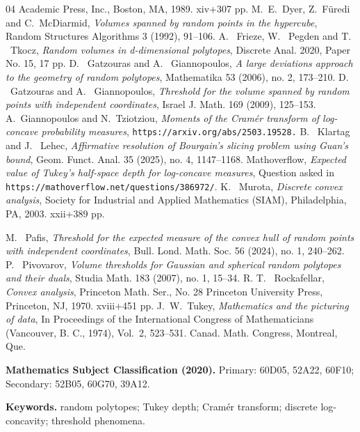 \documentclass[11pt,a4paper]{article} %
\theoremstyle{definition}
\theoremstyle{remark}
\newcommand{\1}{\mathds{1}}
\begin{document}
\begin{thebibliography}{04}
Academic Press, Inc., Boston, MA, 1989. xiv+307 pp.
 \textrm{M.\ E.\ Dyer, Z.\ F\"{u}redi and C.\ McDiarmid}, \textit{Volumes
spanned by random points in the hypercube}, Random Structures
Algorithms 3 (1992), 91--106.
 \textrm{A. \ Frieze, W. \ Pegden and T. \ Tkocz}, \textit{Random volumes in d-dimensional polytopes}, Discrete Anal. 2020, Paper No. 15, 17 pp.
 \textrm{D. \ Gatzouras and A. \ Giannopoulos}, \textit{A large deviations approach to the geometry of random polytopes}, Mathematika 53 (2006), no. 2, 173–210.
 \textrm{D. \ Gatzouras and A. \ Giannopoulos}, \textit{Threshold for the volume spanned by random points with independent coordinates}, Israel J. Math. 169 (2009), 125–153.
 \textrm{A.\ Giannopoulos and N.\ Tziotziou}, \textit{Moments of the Cram\'{e}r transform of log-concave probability measures},  \texttt{https://arxiv.org/abs/2503.19528.}
 \textrm{B. \ Klartag and J. \ Lehec}, \textit{Affirmative resolution of Bourgain's slicing problem using Guan's bound}, Geom. Funct. Anal. 35 (2025), no. 4, 1147–1168.
 {\rm Mathoverflow}, \textit{Expected value of Tukey's half-space depth for log-concave measures}, Question asked in {\tt https://mathoverflow.net/questions/386972/}.
 \textrm{K. \ Murota}, \textit{Discrete convex analysis}, Society for Industrial and Applied Mathematics (SIAM), Philadelphia, PA, 2003. xxii+389 pp.

 \textrm{M. \ Pafis}, \textit{Threshold for the expected measure of the convex hull of random points with independent coordinates}, Bull. Lond. Math. Soc. 56 (2024), no. 1, 240–262.
 \textrm{P. \ Pivovarov}, \textit{Volume thresholds for Gaussian and spherical random polytopes and their duals}, Studia Math. 183 (2007), no. 1, 15–34.
 \textrm{R. T. \ Rockafellar}, \textit{Convex analysis}, Princeton Math. Ser., No. 28
Princeton University Press, Princeton, NJ, 1970. xviii+451 pp.
 \textrm{J.\ W.\ Tukey}, \textit{Mathematics and the picturing of data}, In Proceedings
of the International Congress of Mathematicians (Vancouver, B. C., 1974), Vol.~2, 523--531. Canad. Math. Congress, Montreal, Que.

\end{thebibliography}
\noindent\textbf{Mathematics Subject Classification (2020).}
Primary: 60D05, 52A22, 60F10; Secondary: 52B05, 60G70, 39A12.

\noindent\textbf{Keywords.}
random polytopes; Tukey depth; Cram\'er transform; discrete log-concavity; threshold phenomena.
\end{document}
